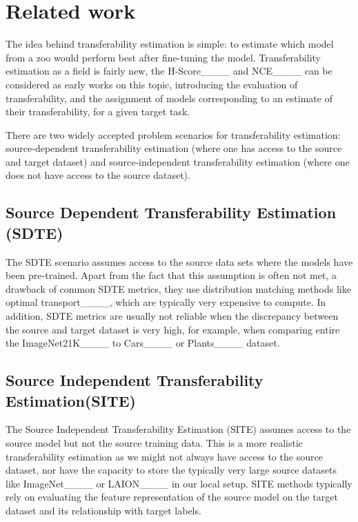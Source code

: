 \section{Related work}
\label{related works}
The idea behind transferability estimation is simple: to estimate which model from a zoo would perform best after fine-tuning the model. Transferability estimation as a field is fairly new, the H-Score____ and NCE____ can be considered as early works on this topic, introducing the evaluation of transferability, and the assignment of models corresponding to an estimate of their transferability, for a given target task. 

There are two widely accepted problem scenarios for transferability estimation: source-dependent transferability estimation (where one has access to the source and target dataset) and source-independent transferability estimation (where one does not have access to the source dataset). 
\subsection{Source Dependent Transferability Estimation (SDTE)}
The SDTE scenario assumes access to the source data sets where the models have been pre-trained.
Apart from the fact that this assumption is often not met, a drawback of common SDTE metrics, they use distribution matching methods like optimal transport____, which are typically very expensive to compute. In addition, SDTE metrics are usually not reliable when the discrepancy between the source and target dataset is very high, for example, when comparing entire the ImageNet21K____ to Cars____ or Plants____ dataset.


\subsection{Source Independent Transferability Estimation(SITE)}
The Source Independent Transferability Estimation (SITE) assumes access to the source model but not the source training data. This is a more realistic transferability estimation as we might not always have access to the source dataset, nor have the capacity to store the typically very large source datasets like ImageNet____ or LAION____ in our local setup. SITE methods typically rely on evaluating the feature representation of the source model on the target dataset and its relationship with target labels. 

